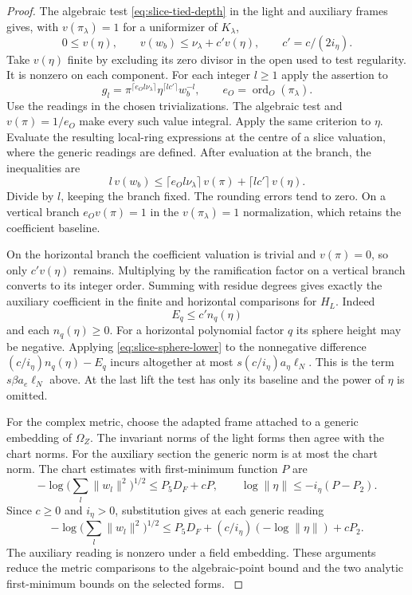 \begin{proof}
The algebraic test \eqref{eq:slice-tied-depth}
in the light and auxiliary frames gives, with
\(v(\pi_\lambda)=1\) for a uniformizer of \(K_\lambda\),
\[
 0\le v(\eta),\qquad
 v(w_b)\le\nu_\lambda+c'v(\eta),\qquad c'=c/(2i_\eta).
\]
Take \(v(\eta)\) finite by excluding its zero divisor in the
open used to test regularity. It is nonzero on each component.
For each integer \(l\ge1\) apply the assertion to
\[
 g_l=\pi^{\lceil e_O l\nu_\lambda\rceil}
           \eta^{\lceil l c'\rceil}w_b^{-l},
 \qquad e_O=\operatorname{ord}_O(\pi_\lambda).
\]
Use the readings in the chosen trivializations. The algebraic
test and \(v(\pi)=1/e_O\) make every such value integral.
Apply the same criterion to \(\eta\). Evaluate the resulting
local-ring expressions at the centre of a slice valuation,
where the generic readings are defined. After evaluation at the branch, the inequalities are
\[
 l\,v(w_b)\le
   \lceil e_Ol\nu_\lambda\rceil\,v(\pi)
      +\lceil lc'\rceil\,v(\eta).
\]
Divide by \(l\), keeping the branch fixed. The rounding
errors tend to zero. On a vertical branch
\(e_Ov(\pi)=1\) in the \(v(\pi_\lambda)=1\) normalization,
which retains the coefficient baseline.

On the horizontal
branch the coefficient valuation is trivial and
\(v(\pi)=0\), so only \(c'v(\eta)\) remains. Multiplying
by the ramification factor on a vertical branch converts to
its integer order. Summing with residue degrees gives exactly
the auxiliary coefficient in the finite and horizontal
comparisons for \(H_L\). Indeed 
\[
  E_q\le c'n_q(\eta)
\]
and each \(n_q(\eta)\ge0\). For a horizontal polynomial
factor \(q\) its sphere height may be negative. Applying
\eqref{eq:slice-sphere-lower} to the nonnegative difference
\((c/i_\eta)n_q(\eta)-E_q\) incurs altogether at most
\(s(c/i_\eta)a_\eta\ell_N\). This is the term
\(s\beta a_e\ell_N\) above. At the last lift the
test has only its baseline and the power of \(\eta\) is omitted.

For the complex metric, choose the adapted frame attached to a
generic embedding of \(\Omega_Z\). The invariant norms of the
light forms then agree with the chart norms. For the auxiliary
section the generic norm is at most the chart norm. The chart
estimates with first-minimum function \(P\) are
\[
 -\log\big(\sum_l\|w_l\|^2\big)^{1/2}\le P_5 D_F+cP,
 \qquad \log\|\eta\|\le-i_\eta(P-P_2).
\]
Since \(c\ge0\) and \(i_\eta>0\), substitution gives at each
generic reading
\[
 -\log\big(\sum_l\|w_l\|^2\big)^{1/2}
  \le P_5D_F+ (c/i_\eta)(-\log\|\eta\|)+cP_2 .
\]
The auxiliary reading is nonzero under a field embedding. These
arguments reduce the metric comparisons to the algebraic-point
bound and the two analytic first-minimum
bounds on the selected forms. \label{cor:slice-metrics-4}
\end{proof}
